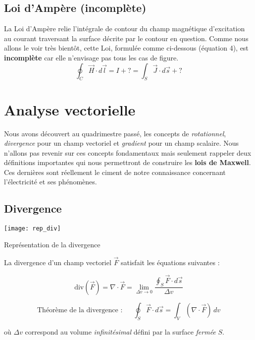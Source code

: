 \subsection{Loi d'Ampère (incomplète)}

La Loi d'Ampère relie l'intégrale de contour du champ magnétique d'excitation au courant traversant la surface décrite par le contour en question. 
Comme nous allons le voir très bientôt, cette Loi, formulée comme ci-dessous (équation 4), est \textbf{incomplète} car elle n'envisage pas tous les cas de figure.
\begin{equation}
 \oint_{C} \vec{H} \cdot d\vec{l} = I + ? = \int_{S} \vec{J} \cdot d\vec{s} + ? 
 \label{AmpèreIntegral}
\end{equation}

\section{Analyse vectorielle}

Nous avons découvert au quadrimestre passé, les concepts de \textit{rotationnel}, \textit{divergence} pour un champ vectoriel et \textit{gradient} pour un champ scalaire.
Nous n'allons pas revenir sur ces concepts fondamentaux mais seulement rappeler deux définitions importantes qui nous permettront de construire les \textbf{lois de Maxwell}. 
Ces dernières sont réellement le ciment de notre connaissance concernant l'électricité et ses phénomènes. \\ 

\subsection{Divergence} 
\begin{marginfigure}[-5cm]
	\texttt{[image: rep\_div]}
	\caption{Représentation de la divergence}
\end{marginfigure}

La divergence d'un champ vectoriel $\vec{F}$ satisfait les équations suivantes : 

\[ \text{div}(\vec{F}) = \nabla \cdot \vec{F} = \lim_{\Delta v \to 0} \frac{\oint_{S} \vec{F} \cdot d\vec{s}}{\Delta v} \]

\[\mbox{Théorème de la divergence : } \hspace{15pt} \oint_{S} \vec{F} \cdot d\vec{s} = \int_{V} (\nabla \cdot \vec{F}) \, dv\]

où $\Delta v$ correspond au volume \textit{infinitésimal} défini par la surface \textit{fermée} $S$.




